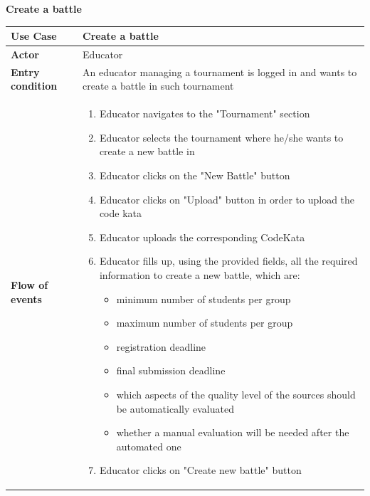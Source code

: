 \documentclass[../RASD.tex]{subfiles}
\begin{document}
        \textbf{Create a battle}
        \begin{table}[H]
            \begin{center}
                \begin{tabular}{|m{10em}|m{30em}|}
                \hline
                \textbf{Use Case} & Create a battle\\
                \hline
                \textbf{Actor} & Educator\\
                \hline
                \textbf{Entry condition} & An educator managing a tournament is logged in and wants to create a battle in such tournament\\
                \hline
                \textbf{Flow of events} & 
                    \begin{enumerate}
                        \item Educator navigates to the "Tournament" section
                        \item Educator selects the tournament where he/she wants to create a new battle in
                        \item Educator clicks on the "New Battle" button
                        \item Educator clicks on "Upload" button in order to upload the code kata
                        \item Educator uploads the corresponding CodeKata
                        \item Educator fills up, using the provided fields, all the required information to create a new battle, which are:
                            \begin{itemize}
                                \item minimum number of students per group
                                \item maximum number of students per group
                                \item registration deadline
                                \item final submission deadline
                                \item which aspects of the quality level of the sources should be automatically evaluated
                                \item whether a manual evaluation will be needed after the automated one
                            \end{itemize}
                        \item Educator clicks on "Create new battle" button

\end{enumerate}
\end{tabular}
\end{center}
\end{table}
\end{document}
